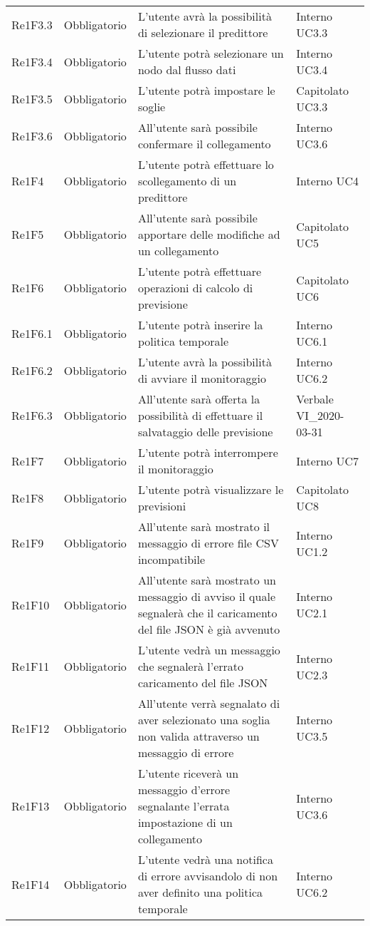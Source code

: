 \begin{longtable}{C{3cm} C{3cm} L{5.5cm} C{3cm}}
Re1F3.3 & Obbligatorio & L’utente avrà la possibilità di selezionare il predittore  &  Interno UC3.3\\
Re1F3.4 & Obbligatorio & L’utente potrà selezionare un nodo dal flusso dati &  Interno UC3.4\\
Re1F3.5 & Obbligatorio & L’utente potrà impostare le soglie &  Capitolato UC3.3\\
Re1F3.6 & Obbligatorio & All’utente sarà possibile confermare il collegamento &  Interno UC3.6\\
Re1F4 & Obbligatorio & L’utente potrà effettuare lo scollegamento di un predittore &  Interno UC4\\
Re1F5 & Obbligatorio & All’utente sarà possibile apportare delle modifiche ad un collegamento & Capitolato UC5\\
Re1F6 & Obbligatorio & L’utente potrà effettuare operazioni di calcolo di previsione &  Capitolato UC6\\
Re1F6.1 & Obbligatorio & L’utente potrà inserire la politica temporale &  Interno UC6.1\\
Re1F6.2 & Obbligatorio & L’utente avrà la possibilità di avviare il monitoraggio &  Interno UC6.2\\
Re1F6.3 & Obbligatorio & All’utente sarà offerta la possibilità di effettuare il salvataggio delle previsione &  Verbale VI\_2020-03-31\\
Re1F7 & Obbligatorio & L’utente potrà interrompere il monitoraggio & Interno UC7\\
Re1F8 & Obbligatorio & L’utente potrà visualizzare le previsioni &  Capitolato UC8\\
Re1F9 & Obbligatorio & All’utente sarà mostrato il messaggio di errore file CSV incompatibile &  Interno UC1.2\\
Re1F10 & Obbligatorio & All’utente sarà mostrato un messaggio di avviso il quale segnalerà che il caricamento del file JSON è già avvenuto &  Interno UC2.1\\
Re1F11 & Obbligatorio & L’utente vedrà un messaggio che segnalerà l’errato caricamento del file JSON &  Interno UC2.3\\
Re1F12 & Obbligatorio & All’utente verrà segnalato di aver selezionato una soglia non valida attraverso un messaggio di errore &  Interno
UC3.5\\
Re1F13 & Obbligatorio & 
L’utente riceverà un messaggio d’errore segnalante l’errata impostazione di un collegamento & Interno UC3.6\\
Re1F14 & Obbligatorio & L’utente vedrà una notifica di errore avvisandolo di non aver definito una politica temporale &  Interno UC6.2\\

\end{longtable}

